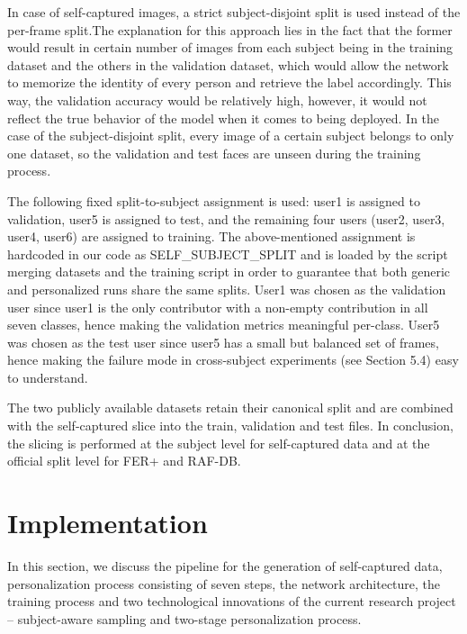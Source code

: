 \documentclass[12pt,a4paper]{article}
\begin{document}
In case of self-captured images, a strict subject-disjoint split is used instead of the per-frame split.The explanation for this approach lies in the fact that the former would result in certain number of images from each subject being in the training dataset and the others in the validation dataset, which would allow the network to memorize the identity of every person and retrieve the label accordingly. This way, the validation accuracy would be relatively high, however, it would not reflect the true behavior of the model when it comes to being deployed. In the case of the subject-disjoint split, every image of a certain subject belongs to only one dataset, so the validation and test faces are unseen during the training process.

The following fixed split-to-subject assignment is used: user1 is assigned to validation, user5
is assigned to test, and the remaining four users (user2, user3, user4, user6) are assigned
to training. The above-mentioned assignment is hardcoded in our code as SELF_SUBJECT_SPLIT and is loaded by the script merging datasets and the training script in order to guarantee that both generic and personalized runs share the same splits. User1 was chosen as the validation user since user1 is the only contributor with a non-empty contribution in all seven classes, hence making the validation metrics meaningful per-class. User5 was chosen as the test user since user5 has a small but balanced set of frames, hence making the failure mode in cross-subject experiments (see Section 5.4) easy to understand.

The two publicly available datasets retain their canonical split and are combined with the self-captured slice into the train, validation and test files. In conclusion, the slicing is performed at the subject level for self-captured data and at the official split level for FER+ and RAF-DB.

\section{Implementation}
\label{sec:impl}

In this section, we discuss the pipeline for the generation of
self-captured data, personalization process consisting of seven
steps, the network architecture, the training process and two
technological innovations of the current research project --
subject-aware sampling and two-stage personalization process.
\end{document}
